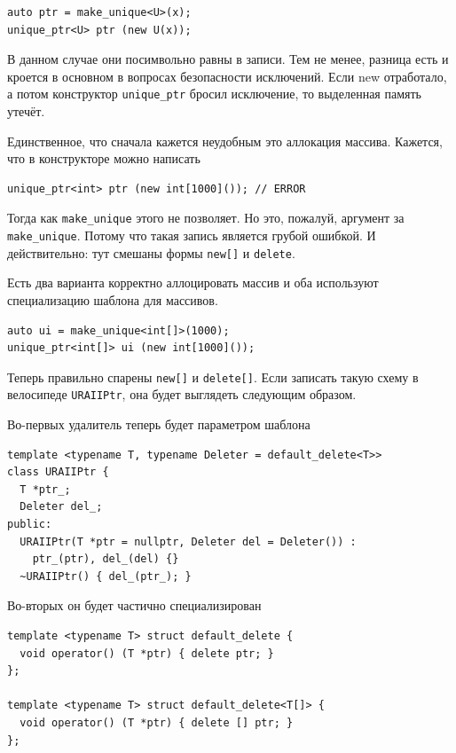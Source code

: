 \documentclass[a4paper,12pt,oneside]{article}
\begin{document}
\begin{lstlisting}
auto ptr = make_unique<U>(x);
unique_ptr<U> ptr (new U(x));
\end{lstlisting}

В данном случае они посимвольно равны в записи. Тем не менее, разница есть и кроется в основном в вопросах безопасности исключений. Если new отработало, а потом конструктор \lstinline!unique_ptr! бросил исключение, то выделенная память утечёт.

Единственное, что сначала кажется неудобным это аллокация массива. Кажется, что в конструкторе можно написать

\begin{lstlisting}
unique_ptr<int> ptr (new int[1000]()); // ERROR
\end{lstlisting}

Тогда как \lstinline!make_unique! этого не позволяет. Но это, пожалуй, аргумент за \lstinline!make_unique!. Потому что такая запись является грубой ошибкой. И действительно: тут смешаны формы \lstinline!new[]! и \lstinline!delete!.

Есть два варианта корректно аллоцировать массив и оба используют специализацию шаблона для массивов.

\begin{lstlisting}
auto ui = make_unique<int[]>(1000);
unique_ptr<int[]> ui (new int[1000]());
\end{lstlisting}

Теперь правильно спарены \lstinline!new[]! и \lstinline!delete[]!. Если записать такую схему в велосипеде \lstinline!URAIIPtr!, она будет выглядеть следующим образом.

Во-первых удалитель теперь будет параметром шаблона

\begin{lstlisting}
template <typename T, typename Deleter = default_delete<T>> 
class URAIIPtr {
  T *ptr_;
  Deleter del_;
public:
  URAIIPtr(T *ptr = nullptr, Deleter del = Deleter()) :
    ptr_(ptr), del_(del) {}
  ~URAIIPtr() { del_(ptr_); }
\end{lstlisting}

Во-вторых он будет частично специализирован

\begin{lstlisting}
template <typename T> struct default_delete {
  void operator() (T *ptr) { delete ptr; }
};

template <typename T> struct default_delete<T[]> {
  void operator() (T *ptr) { delete [] ptr; }
};
\end{lstlisting}
\end{document}
